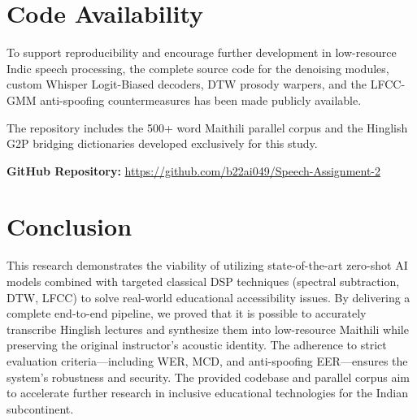 \documentclass[conference]{IEEEtran}
\begin{document}
\section{Code Availability}

To support reproducibility and encourage further development in low-resource Indic speech processing, the complete source code for the denoising modules, custom Whisper Logit-Biased decoders, DTW prosody warpers, and the LFCC-GMM anti-spoofing countermeasures has been made publicly available.

The repository includes the 500+ word Maithili parallel corpus and the Hinglish G2P bridging dictionaries developed exclusively for this study.

\textbf{GitHub Repository:} \href{https://github.com/b22ai049/Speech-Assignment-2}{https://github.com/b22ai049/Speech-Assignment-2}

\section{Conclusion}

This research demonstrates the viability of utilizing state-of-the-art zero-shot AI models combined with targeted classical DSP techniques (spectral subtraction, DTW, LFCC) to solve real-world educational accessibility issues. By delivering a complete end-to-end pipeline, we proved that it is possible to accurately transcribe Hinglish lectures and synthesize them into low-resource Maithili while preserving the original instructor's acoustic identity. The adherence to strict evaluation criteria—including WER, MCD, and anti-spoofing EER—ensures the system's robustness and security. The provided codebase and parallel corpus aim to accelerate further research in inclusive educational technologies for the Indian subcontinent.
\end{document}
